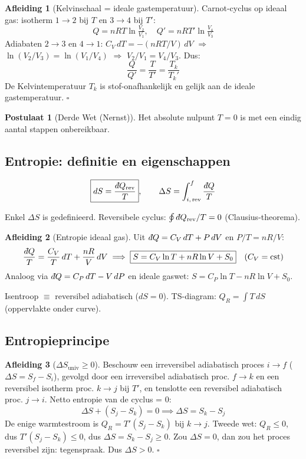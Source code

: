 \documentclass[a4paper,twoside,10pt]{article}
\theoremstyle{definition}
\newtheorem{postulate}{Postulaat}[section]
\newtheorem{derivation}{Afleiding}[section]
\newcommand{\dbar}{{\mkern+3mu\mathchar'26\mkern-12mu d}}
\begin{document}
\begin{derivation}[Kelvinschaal = ideale gastemperatuur]
Carnot-cyclus op ideaal gas: isotherm $1\to2$ bij $T$ en $3\to4$ bij $T'$:
\[
  Q = nRT\ln\!\tfrac{V_2}{V_1}, \quad Q' = nRT'\ln\!\tfrac{V_4}{V_3}
\]
Adiabaten $2\to3$ en $4\to1$: $C_V\,dT = -(nRT/V)\,dV$ $\Rightarrow$
$\ln(V_2/V_3) = \ln(V_1/V_4)$ $\Rightarrow$ $V_2/V_1 = V_4/V_3$. Dus:
\[
  \frac{Q}{Q'} = \frac{T}{T'} = \frac{T_k}{T_k'}
\]
De Kelvintemperatuur $T_k$ is stof-onafhankelijk en gelijk aan de ideale gastemperatuur. \hfill$\square$
\end{derivation}

\begin{postulate}[Derde Wet (Nernst)]
Het absolute nulpunt $T=0$ is met een eindig aantal stappen onbereikbaar.
\end{postulate}

\subsection{Entropie: definitie en eigenschappen}

\[
  \boxed{dS = \frac{\dbar Q_{\mathrm{rev}}}{T}},
  \qquad
  \Delta S = \int_{i,\,\mathrm{rev}}^{f}\frac{\dbar Q}{T}
\]

Enkel $\Delta S$ is gedefinieerd.
Reversibele cyclus: $\oint \dbar Q_{\mathrm{rev}}/T = 0$ (Clausius-theorema).

\begin{derivation}[Entropie ideaal gas]
Uit $\dbar Q = C_V\,dT + P\,dV$ en $P/T = nR/V$:
\[
  \frac{\dbar Q}{T} = \frac{C_V}{T}\,dT + \frac{nR}{V}\,dV
  \implies \boxed{S = C_V\ln T + nR\ln V + S_0} \quad (C_V=\mathrm{cst})
\]
Analoog via $\dbar Q = C_P\,dT - V\,dP$ en ideale gaswet:
$S = C_P\ln T - nR\ln V + S_0$.
\end{derivation}

Isentroop $\equiv$ reversibel adiabatisch ($dS=0$).
TS-diagram: $Q_R = \int T\,dS$ (oppervlakte onder curve).

\subsection{Entropieprincipe}

\begin{derivation}[$\Delta S_{\mathrm{univ}} \geq 0$]
Beschouw een irreversibel adiabatisch proces $i\to f$ ($\Delta S = S_f - S_i$),
gevolgd door een irreversibel adiabatisch proc. $f\to k$ en een reversibel
isotherm proc. $k\to j$ bij $T'$, en tenslotte een reversibel adiabatisch proc.
$j\to i$. Netto entropie van de cyclus = 0:
\[
  \Delta S + (S_j - S_k) = 0 \implies \Delta S = S_k - S_j
\]
De enige warmtestroom is $Q_R = T'(S_j - S_k)$ bij $k\to j$.
Tweede wet: $Q_R \leq 0$, dus $T'(S_j-S_k)\leq 0$, dus $\Delta S = S_k - S_j \geq 0$.
Zou $\Delta S = 0$, dan zou het proces reversibel zijn: tegenspraak. Dus $\Delta S > 0$. \hfill$\square$
\end{derivation}
\end{document}
